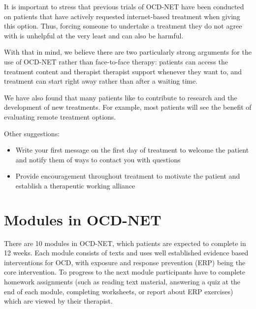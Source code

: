\documentclass[]{book}
\providecommand{\tightlist}{%
  \setlength{\itemsep}{0pt}\setlength{\parskip}{0pt}}
\theoremstyle{definition}
\theoremstyle{definition}
\theoremstyle{definition}
\theoremstyle{remark}
\begin{document}
It is important to stress that previous trials of OCD-NET have been
conducted on patients that have actively requested internet-based
treatment when giving this option. Thus, forcing someone to undertake a
treatment they do not agree with is unhelpful at the very least and can
also be harmful.

With that in mind, we believe there are two particularly strong
arguments for the use of OCD-NET rather than face-to-face therapy:
patients can access the treatment content and therapist therapist
support whenever they want to, and treatment can start right away rather
than after a waiting time.

We have also found that many patients like to contribute to research and
the development of new treatments. For example, most patients will see
the benefit of evaluating remote treatment options.

Other suggestions:

\begin{itemize}
\tightlist
\item
  Write your first message on the first day of treatment to welcome the
  patient and notify them of ways to contact you with questions
\item
  Provide encouragement throughout treatment to motivate the patient and
  establish a therapeutic working alliance
\end{itemize}

\hypertarget{modules-in-ocd-net}{%
\section{Modules in OCD-NET}\label{modules-in-ocd-net}}

There are 10 modules in OCD-NET, which patients are expected to complete
in 12 weeks. Each module consists of texts and uses well established
evidence based interventions for OCD, with exposure and response
prevention (ERP) being the core intervention. To progress to the next
module participants have to complete homework assignments (such as
reading text material, answering a quiz at the end of each module,
completing worksheets, or report about ERP exercises) which are viewed
by their therapist.
\end{document}
